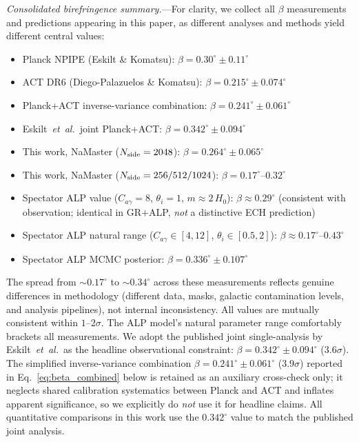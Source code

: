 \documentclass[aps,prd,twocolumn,superscriptaddress,showpacs,preprintnumbers,nofootinbib,longbibliography,floatfix]{revtex4-2}
\newcommand{\etal}{\textit{et~al.}}
\begin{document}
\textit{Consolidated birefringence summary.}---For clarity, we collect all $\beta$ measurements and predictions appearing in this paper, as different analyses and methods yield different central values:
\begin{itemize}[leftmargin=*]
\item Planck NPIPE (Eskilt \& Komatsu): $\beta = 0.30^\circ \pm 0.11^\circ$
\item ACT DR6 (Diego-Palazuelos \& Komatsu): $\beta = 0.215^\circ \pm 0.074^\circ$
\item Planck+ACT inverse-variance combination: $\beta = 0.241^\circ \pm 0.061^\circ$
\item Eskilt~\etal\ joint Planck+ACT: $\beta = 0.342^\circ \pm 0.094^\circ$
\item This work, NaMaster ($N_{\rm side} = 2048$): $\beta = 0.264^\circ \pm 0.065^\circ$
\item This work, NaMaster ($N_{\rm side} = 256/512/1024$): $\beta = 0.17^\circ$--$0.32^\circ$
\item Spectator ALP value ($C_{a\gamma} = 8$, $\theta_i = 1$, $m \approx 2\,H_0$): $\beta \approx 0.29^\circ$ (consistent with observation; identical in GR$+$ALP, \emph{not} a distinctive ECH prediction)
\item Spectator ALP natural range ($C_{a\gamma} \in [4,12]$, $\theta_i \in [0.5,2]$): $\beta \approx 0.17^\circ$--$0.43^\circ$
\item Spectator ALP MCMC posterior: $\beta = 0.336^\circ \pm 0.107^\circ$
\end{itemize}
The spread from ${\sim}0.17^\circ$ to ${\sim}0.34^\circ$ across these measurements reflects genuine differences in methodology (different data, masks, galactic contamination levels, and analysis pipelines), not internal inconsistency. All values are mutually consistent within $1$--$2\sigma$. The ALP model's natural parameter range comfortably brackets all measurements. We adopt the published joint single-analysis by Eskilt~\etal\ as the headline observational constraint: $\beta = 0.342^\circ \pm 0.094^\circ$ ($3.6\sigma$). The simplified inverse-variance combination $\beta = 0.241^\circ \pm 0.061^\circ$ ($3.9\sigma$) reported in Eq.~\eqref{eq:beta_combined} below is retained as an auxiliary cross-check only; it neglects shared calibration systematics between Planck and ACT and inflates apparent significance, so we explicitly do \emph{not} use it for headline claims. All quantitative comparisons in this work use the $0.342^\circ$ value to match the published joint analysis.
\end{document}
